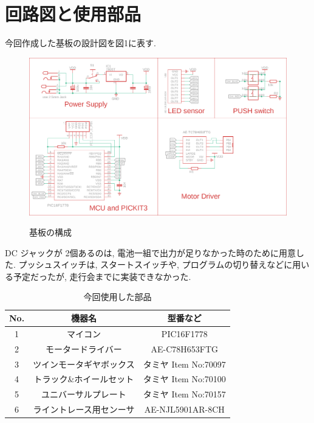 \documentclass[
]{ltjarticle}
\begin{document}
\section{回路図と使用部品}
今回作成した基板の設計図を図1に表す. 
\begin{figure}[hbp]
    \centering
    \includegraphics[width=\linewidth]{report/fig1.png}
    \label{fig:fig1}
    \caption{基板の構成}
\end{figure}
    
DC ジャックが 2個あるのは, 電池一組で出力が足りなかった時のために用意した. 
プッシュスイッチは, スタートスイッチや, プログラムの切り替えなどに用いる予定だったが, 走行会までに実装できなかった. 
\newpage
\begin{table}[H]
    \label{tab1}
    \caption{今回使用した部品}
    \begin{center}
        \begin{tabular}{ccc}
    \hline
No. & 機器名& 型番など\\\hline
1&マイコン & PIC16F1778\\
2&モータードライバー & AE-C78H653FTG\\
3&ツインモータギヤボックス& タミヤ Item No:70097\\
4&トラック\&ホイールセット &タミヤ Item No:70100\\
5&ユニバーサルプレート&タミヤ Item No:70157\\
6&ライントレース用センーサ& AE-NJL5901AR-8CH\\\hline
    
\end{tabular}
\end{center}
\end{table}
\end{document}
